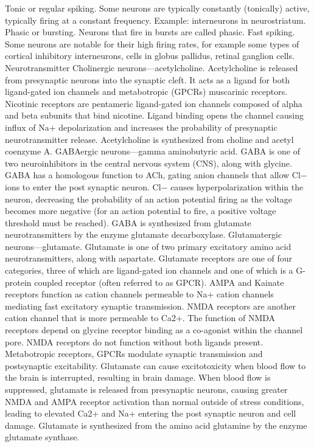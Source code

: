 Tonic or regular spiking. Some neurons are typically constantly (tonically) active, typically firing at a constant frequency. Example: interneurons in neurostriatum.
Phasic or bursting. Neurons that fire in bursts are called phasic.
Fast spiking. Some neurons are notable for their high firing rates, for example some types of cortical inhibitory interneurons, cells in globus pallidus, retinal ganglion cells.
Neurotransmitter
Cholinergic neurons---acetylcholine. Acetylcholine is released from presynaptic neurons into the synaptic cleft. It acts as a ligand for both ligand-gated ion channels and metabotropic (GPCRs) muscarinic receptors. Nicotinic receptors are pentameric ligand-gated ion channels composed of alpha and beta subunits that bind nicotine. Ligand binding opens the channel causing influx of Na+ depolarization and increases the probability of presynaptic neurotransmitter release. Acetylcholine is synthesized from choline and acetyl coenzyme A.
GABAergic neurons---gamma aminobutyric acid. GABA is one of two neuroinhibitors in the central nervous system (CNS), along with glycine. GABA has a homologous function to ACh, gating anion channels that allow Cl− ions to enter the post synaptic neuron. Cl− causes hyperpolarization within the neuron, decreasing the probability of an action potential firing as the voltage becomes more negative (for an action potential to fire, a positive voltage threshold must be reached). GABA is synthesized from glutamate neurotransmitters by the enzyme glutamate decarboxylase.
Glutamatergic neurons---glutamate. Glutamate is one of two primary excitatory amino acid neurotransmitters, along with aspartate. Glutamate receptors are one of four categories, three of which are ligand-gated ion channels and one of which is a G-protein coupled receptor (often referred to as GPCR).
AMPA and Kainate receptors function as cation channels permeable to Na+ cation channels mediating fast excitatory synaptic transmission.
NMDA receptors are another cation channel that is more permeable to Ca2+. The function of NMDA receptors depend on glycine receptor binding as a co-agonist within the channel pore. NMDA receptors do not function without both ligands present.
Metabotropic receptors, GPCRs modulate synaptic transmission and postsynaptic excitability.
Glutamate can cause excitotoxicity when blood flow to the brain is interrupted, resulting in brain damage. When blood flow is suppressed, glutamate is released from presynaptic neurons, causing greater NMDA and AMPA receptor activation than normal outside of stress conditions, leading to elevated Ca2+ and Na+ entering the post synaptic neuron and cell damage. Glutamate is synthesized from the amino acid glutamine by the enzyme glutamate synthase.
